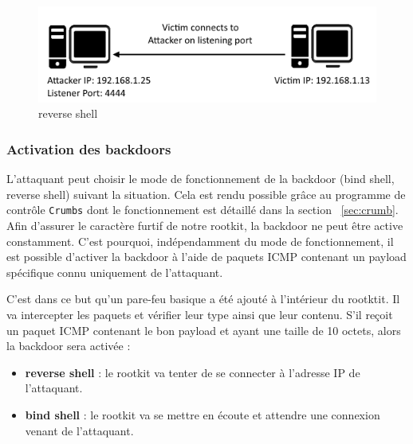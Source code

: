 \documentclass[12pt]{article}
\begin{document}
\begin{figure}[H] 
\begin{center}
\includegraphics{./img/reverse-shell.png}

\caption[dsfsdf]{reverse shell}
\label{figure:3}
\end{center}
\end{figure}
            
        \subsubsection{Activation des backdoors}
            
            L'attaquant peut choisir le mode de fonctionnement de la backdoor (bind shell, reverse shell) suivant la situation. Cela est rendu possible grâce au programme de contrôle \texttt{Crumbs} dont le fonctionnement est détaillé dans la section ~\ref{sec:crumb}. 
			Afin d'assurer le caractère furtif de notre rootkit, la backdoor ne peut être active constamment. C'est pourquoi, indépendamment du mode de fonctionnement, il est possible d'activer la backdoor à l'aide de paquets ICMP contenant un payload spécifique connu uniquement de l'attaquant.
            

C'est dans ce but qu'un pare-feu basique a été ajouté à l'intérieur du rootktit. Il va intercepter les paquets et vérifier leur type ainsi que leur contenu. S'il reçoit un paquet ICMP contenant le bon payload et ayant une taille de 10 octets, alors la backdoor sera activée :
\begin{itemize}
 \item \textbf{reverse shell} : le rootkit va tenter de se connecter à l'adresse IP de l'attaquant.
 \item \textbf{bind shell} : le rootkit va se mettre en écoute et attendre une connexion venant de l'attaquant.
\end{itemize}
\end{document}

